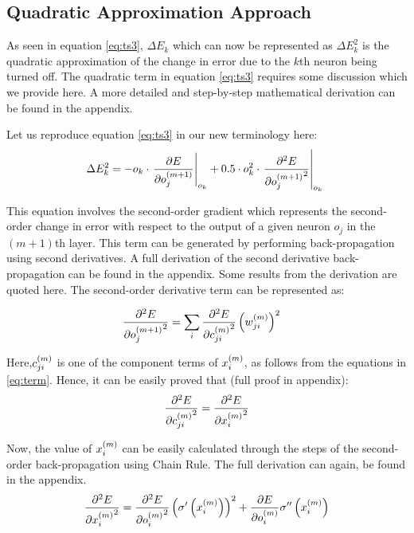 \subsection{Quadratic Approximation Approach}

As seen in equation \ref{eq:ts3}, $\Delta E_k$ which can now be represented as $\Delta E_{k}^2$ is the quadratic approximation of the change in error due to the $k$th neuron being turned off. The quadratic term in equation \ref{eq:ts3} requires some discussion which we provide here. A more detailed and step-by-step mathematical derivation can be found in the appendix.

Let us reproduce equation \ref{eq:ts3} in our new terminology here: 
\begin{align}
\Delta E_{k}^2 = - o_k\cdot \left.\pdv{E}{{o_{j}^{(m+1)}}}\right|_{o_k} + 0.5\cdot o_k^2\cdot \left.\pdv[2]{E}{{o_{j}^{(m+1)}}}\right|_{o_k}\
\end{align}

This equation involves the second-order gradient which represents the second-order change in error with respect to the output of a given neuron $o_j$ in the $(m+1)$th layer. This term can be generated by performing back-propagation using second derivatives. A full derivation of the second derivative back-propagation can be found in the appendix. Some results from the derivation are quoted here. The second-order derivative term can be represented as:

\begin{align}
\pdv[2]{E}{{o_{j}^{(m+1)}}} &= \sum_i
\pdv[2]{E}{{c_{ji}^{(m)}}} \left({w_{ji}^{(m)}}\right)^2
\end{align} 

Here,$c_{ji}^{(m)}$ is one of the component terms of $x_{i}^{(m)}$, as follows from the equations in \ref{eq:term}. Hence, it can be easily proved that (full proof in appendix):
\begin{align}
\pdv[2]{E}{{c_{ji}^{(m)}}} = \pdv[2]{E}{{x_{i}^{(m)}}}
\end{align}

Now, the value of $x_{i}^{(m)}$ can be easily calculated through the steps of the second-order back-propagation using Chain Rule. The full derivation can again, be found in the appendix.
\begin{align}
\pdv[2]{E}{{x_{i}^{(m)}}}=\pdv[2]{E}{{o_{i}^{(m)}}} \left(\sigma^{\prime}\left({x_{i}^{(m)}}\right)\right)^2
+
\pdv{E}{{o_{i}^{(m)}}}\sigma^{\prime\prime}\left(x_{i}^{(m)}\right)
\end{align}
